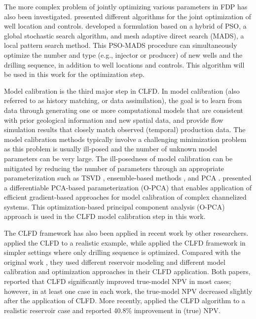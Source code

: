 \documentclass[11pt]{article}
\begin{document}
The more complex problem of jointly optimizing various parameters in FDP has also been investigated.
\citet{bellout:12,li-jafar:12,zhang:17} presented different algorithms for the joint optimization of well location and controls.
\citet{isebor:14a,isebor:14b} developed a formulation based on a hybrid of PSO, a global stochastic search algorithm, and mesh adaptive direct search (MADS), a local pattern search method. This PSO-MADS procedure can simultaneously optimize the number and type (e.g., injector or producer) of new wells and the drilling sequence, in addition to well locations and controls. This algorithm will be used in this work for the optimization step.

Model calibration is the third major step in CLFD.
In model calibration (also referred to as history matching, or data assimilation),
the goal is to learn from data through generating one or more computational models that are consistent with prior
geological information and new spatial data, and provide flow simulation results that closely match observed (temporal) production data.
The model calibration methods typically involve a challenging minimization problem as this problem is
usually ill-posed and the number of unknown model parameters can be very large.
The ill-posedness of model calibration can be mitigated by reducing the number of parameters
through an appropriate parameterization such as TSVD \citep{shirangi:11,shirangi:14,shirangi:16,bjarkason:17,dickstein:17},
ensemble-based methods \citep{rafiee:17,rafiee:17b,rafiee:18}, and PCA \citep{vo:16}.
\citet{vo:15,vo:14} presented a differentiable PCA-based parameterization (O-PCA)
that enables application of efficient gradient-based approaches for model calibration of complex channelized systems.
This optimization-based principal component analysis (O-PCA) approach is used in the CLFD model calibration step in this work.

The CLFD framework has also been applied in recent work by other researchers.
\citet{morosov:16} applied the CLFD to a realistic example,
while \citet{hanea:17} applied the CLFD framework in simpler settings where only drilling sequence is optimized.
Compared with the original work \citep{shirangi:15b,shirangi:13}, they used different reservoir modeling and
different model calibration and optimization approaches in their CLFD application.
Both papers, reported that CLFD significantly improved true-model NPV in most cases;
however, in at least one case in each work, the true-model NPV decreased slightly after the application of CLFD.
More recently, \citet{hidalgo:17} applied the CLFD algorithm to a realistic reservoir case and reported 40.8\% improvement in (true) NPV.
\end{document}
